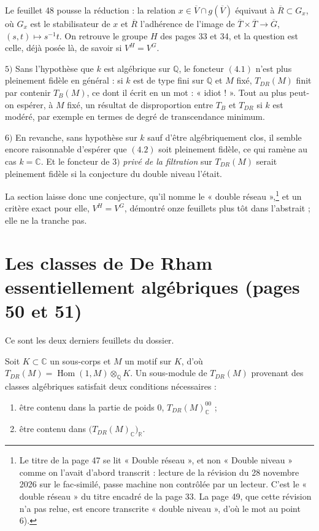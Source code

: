 \documentclass[11pt,a4paper]{article}
\begin{document}
Le feuillet 48 pousse la réduction : la relation $x \in \overline{V} \cap
g(\overline{V})$ équivaut à $\overline{R} \subset G_{x}$, où $G_{x}$ est le
stabilisateur de $x$ et $\overline{R}$ l'adhérence de l'image de
$\overline{T} \times \overline{T} \to \overline{G}$, $(s,t) \mapsto s^{-1}t$. On
retrouve le groupe $H$ des pages 33 et 34, et la question est celle,
déjà posée là, de savoir si $V^{H} = V^{G}$.

$5)$ Sans l'hypothèse que $k$ est algébrique sur $\mathbb{Q}$, le foncteur
$(4.1)$ n'est plus pleinement fidèle en général : si $k$ est de type fini sur
$\mathbb{Q}$ et $M$ fixé, $T_{DR}(M)$ finit par contenir $T_{B}(M)$, ce dont il
écrit en un mot : « idiot ! ». Tout au plus peut-on espérer, à $M$ fixé, un
résultat de disproportion entre $T_{B}$ et $T_{DR}$ si $k$ est modéré,
par exemple en termes de degré de transcendance minimum.

$6)$ En revanche, sans hypothèse sur $k$ sauf d'être algébriquement clos, il
semble encore raisonnable d'espérer que $(4.2)$ soit pleinement fidèle, ce qui
ramène au cas $k = \mathbb{C}$. Et le foncteur de $3)$ \emph{privé de la
filtration} sur $T_{DR}(M)$ serait pleinement fidèle si la conjecture du double
niveau l'était.

La section laisse donc une conjecture, qu'il nomme le
« double réseau »,\footnote{Le titre de la page 47 se lit « Double réseau »,
et non « Double niveau » comme on l'avait d'abord transcrit : lecture de la
révision du 28 novembre 2026 sur le fac-similé, passe machine non contrôlée
par un lecteur. C'est le « double réseau » du titre encadré de la page 33. La page 49, que
cette révision n'a pas relue, est encore transcrite « double niveau », d'où
le mot au point 6).}
et un critère exact pour elle, $V^{H} = V^{G}$, démontré
onze feuillets plus tôt dans l'abstrait ; elle ne la tranche pas.

\section*{Les classes de De Rham essentiellement algébriques (pages 50 et 51)}

Ce sont les deux derniers feuillets du dossier.

Soit $K \subset \mathbb{C}$ un sous-corps et $M$ un motif sur $K$, d'où
$T_{DR}(M) = \operatorname{Hom}(1, M) \otimes_{\mathbb{Q}} K$. Un sous-module de
$T_{DR}(M)$ provenant des classes algébriques satisfait deux conditions
nécessaires :

\begin{enumerate}
  \item[$a)$] être contenu dans la partie de poids $0$,
  $T_{DR}(M)^{00}_{\mathbb{C}}$ ;
  \item[$b)$] être contenu dans $\bigl( T_{DR}(M)_{\mathbb{C}} \bigr)_{\mathbb{R}}$.
\end{enumerate}
\end{document}
